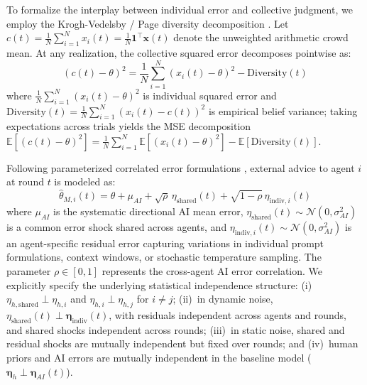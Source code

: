\documentclass
[letterpaper]{article}
\begin{document}
To formalize the interplay between individual error and collective judgment, we employ the Krogh-Vedelsby / Page diversity decomposition \citep{krogh1995neural, page2007difference}. Let $c(t) = \frac{1}{N}\sum_{i=1}^N x_i(t) = \frac{1}{N}\mathbf{1}^\top \mathbf{x}(t)$ denote the unweighted arithmetic crowd mean. At any realization, the collective squared error decomposes pointwise as:
\begin{equation}
(c(t) - \theta)^2 = \frac{1}{N}\sum_{i=1}^N (x_i(t) - \theta)^2 - \text{Diversity}(t)
\label{eq:page_decomposition}
\end{equation}
where $\frac{1}{N}\sum_{i=1}^N (x_i(t) - \theta)^2$ is individual squared error and $\text{Diversity}(t) = \frac{1}{N}\sum_{i=1}^N (x_i(t) - c(t))^2$ is empirical belief variance; taking expectations across trials yields the MSE decomposition $\mathbb{E}[(c(t) - \theta)^2] = \frac{1}{N}\sum_{i=1}^N \mathbb{E}[(x_i(t) - \theta)^2] - \mathbb{E}[\text{Diversity}(t)]$.

Following parameterized correlated error formulations \citep{kleinberg2021algorithmic}, external advice to agent $i$ at round $t$ is modeled as:
\begin{equation}
\hat{\theta}_{M, i}(t) = \theta + \mu_{AI} + \sqrt{\rho} \, \eta_{\text{shared}}(t) + \sqrt{1 - \rho} \, \eta_{\text{indiv}, i}(t)
\label{eq:ai_advice}
\end{equation}
where $\mu_{AI}$ is the systematic directional AI mean error, $\eta_{\text{shared}}(t) \sim \mathcal{N}(0, \sigma^2_{AI})$ is a common error shock shared across agents, and $\eta_{\text{indiv}, i}(t) \sim \mathcal{N}(0, \sigma^2_{AI})$ is an agent-specific residual error capturing variations in individual prompt formulations, context windows, or stochastic temperature sampling. The parameter $\rho \in [0, 1]$ represents the cross-agent AI error correlation. We explicitly specify the underlying statistical independence structure: (i)~$\eta_{h, \text{shared}} \perp \eta_{h, i}$ and $\eta_{h, i} \perp \eta_{h, j}$ for $i \neq j$; (ii)~in dynamic noise, $\eta_{\text{shared}}(t) \perp \boldsymbol{\eta}_{\text{indiv}}(t)$, with residuals independent across agents and rounds, and shared shocks independent across rounds; (iii)~in static noise, shared and residual shocks are mutually independent but fixed over rounds; and (iv)~human priors and AI errors are mutually independent in the baseline model ($\boldsymbol{\eta}_h \perp \boldsymbol{\eta}_{AI}(t)$).
\end{document}
